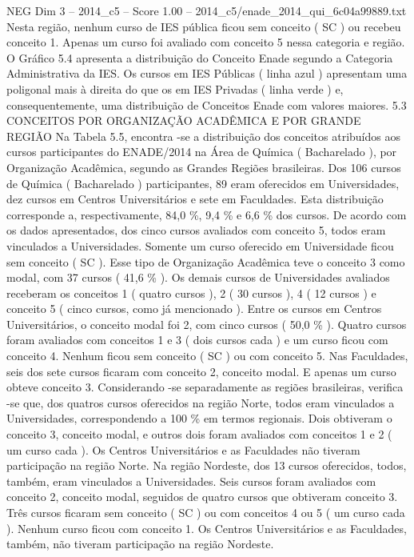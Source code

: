 \begin{textsample}{NEG Dim 3 – 2014\_c5 – Score 1.00 – 2014\_c5/enade\_2014\_qui\_6c04a99889.txt}
Nesta região, nenhum curso de IES pública ficou sem conceito ( SC ) ou recebeu conceito 1.
Apenas um curso foi avaliado com conceito 5 nessa categoria e região.
O Gráfico 5.4 apresenta a distribuição do Conceito Enade segundo a Categoria Administrativa da IES.
Os cursos em IES Públicas ( linha azul ) apresentam uma poligonal mais à direita do que os em IES Privadas ( linha verde ) e, consequentemente, uma distribuição de Conceitos Enade com valores maiores. 5.3 CONCEITOS POR ORGANIZAÇÃO ACADÊMICA E POR GRANDE REGIÃO Na Tabela 5.5, encontra -se a distribuição dos conceitos atribuídos aos cursos participantes do ENADE/2014 na Área de Química ( Bacharelado ), por Organização Acadêmica, segundo as Grandes Regiões brasileiras.
Dos 106 cursos de Química ( Bacharelado ) participantes, 89 eram oferecidos em Universidades, dez cursos em Centros Universitários e sete em Faculdades.
Esta distribuição corresponde a, respectivamente, 84,0 \%, 9,4 \% e 6,6 \% dos cursos.
De acordo com os dados apresentados, dos cinco cursos avaliados com conceito 5, todos eram vinculados a Universidades.
Somente um curso oferecido em Universidade ficou sem conceito ( SC ).
Esse tipo de Organização Acadêmica teve o conceito 3 como modal, com 37 cursos ( 41,6 \% ).
Os demais cursos de Universidades avaliados receberam os conceitos 1 ( quatro cursos ), 2 ( 30 cursos ), 4 ( 12 cursos ) e conceito 5 ( cinco cursos, como já mencionado ).
Entre os cursos em Centros Universitários, o conceito modal foi 2, com cinco cursos ( 50,0 \% ).
Quatro cursos foram avaliados com conceitos 1 e 3 ( dois cursos cada ) e um curso ficou com conceito 4.
Nenhum ficou sem conceito ( SC ) ou com conceito 5.
Nas Faculdades, seis dos sete cursos ficaram com conceito 2, conceito modal.
E apenas um curso obteve conceito 3.
Considerando -se separadamente as regiões brasileiras, verifica -se que, dos quatros cursos oferecidos na região Norte, todos eram vinculados a Universidades, correspondendo a 100 \% em termos regionais.
Dois obtiveram o conceito 3, conceito modal, e outros dois foram avaliados com conceitos 1 e 2 ( um curso cada ).
Os Centros Universitários e as Faculdades não tiveram participação na região Norte.
Na região Nordeste, dos 13 cursos oferecidos, todos, também, eram vinculados a Universidades.
Seis cursos foram avaliados com conceito 2, conceito modal, seguidos de quatro cursos que obtiveram conceito 3.
Três cursos ficaram sem conceito ( SC ) ou com conceitos 4 ou 5 ( um curso cada ).
Nenhum curso ficou com conceito 1.
Os Centros Universitários e as Faculdades, também, não tiveram participação na região Nordeste.

\end{textsample}
